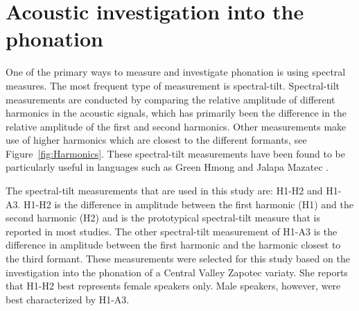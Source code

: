 \documentclass[12pt, letterpaper]{article}
\begin{document}
\section{Acoustic investigation into the phonation} \label{sec:Acoustics}

One of the primary ways to measure and investigate phonation is using spectral measures. The most frequent type of measurement is spectral-tilt. Spectral-tilt measurements are conducted by comparing the relative amplitude of different harmonics in the acoustic signals, which has primarily been the difference in the relative amplitude of the first and second harmonics. Other measurements make use of higher harmonics which are closest to the different formants, see Figure~\ref{fig:Harmonics}. These spectral-tilt measurements have been found to be particularly useful in languages such as Green Hmong \citep{huffmanMeasuresPhonationType1987,andruskiPhonationTypesProduction2000} and Jalapa Mazatec \citep{silvermanPhoneticStructuresJalapa1995,blankenshipTimeCourseBreathiness1997}. 


The spectral-tilt measurements that are used in this study are: H1-H2 and H1-A3. H1-H2 is the difference in amplitude between the first harmonic (H1) and the second harmonic (H2) and is the prototypical spectral-tilt measure that is reported in most studies. The other spectral-tilt measurement of H1-A3 is the difference in amplitude between the first harmonic and the harmonic closest to the third formant. These measurements were selected for this study based on the  investigation into the phonation of a Central Valley Zapotec variaty. She reports that H1-H2 best represents female speakers only. Male speakers, however, were best characterized by H1-A3. 
\end{document}
